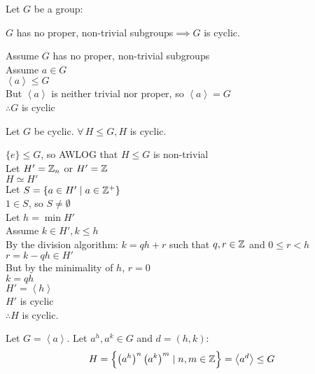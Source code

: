\documentclass[letterpaper,12pt,fleqn]{article}
\newcommand{\cycle}[1]{\left<#1\right>}
\begin{document}
\begin{theorem}
  Let $G$ be a group:

  $G$ has no proper, non-trivial subgroups$\implies G$ is cyclic.
\end{theorem}

\begin{theproof}
  Assume $G$ has no proper, non-trivial subgroups \\
  Assume $a\in G$ \\
  $\cycle{a}\le G$ \\
  But $\cycle{a}$ is neither trivial nor proper, so $\cycle{a}=G$ \\
  $\therefore G$ is cyclic
\end{theproof}

\begin{theorem}
  Let $G$ be cyclic. $\forall\,H\le G,H$ is cyclic.
\end{theorem}

\begin{theproof}
  $\{e\}\le G$, so AWLOG that $H\le G$ is non-trivial \\
  Let $H'=\mathbb{Z}_n$ or $H'=\mathbb{Z}$ \\
  $H\simeq H'$ \\
  Let $S=\{a\in H'\mid a\in\mathbb{Z}^+\}$ \\
  $1\in S$, so $S\ne\emptyset$ \\
  Let $h=\min H'$ \\
  Assume $k\in H',k\le h$ \\
  By the division algorithm: $k=qh+r$ such that $q,r\in\mathbb{Z}$ and $0\le r<h$ \\
  $r=k-qh\in H'$ \\
  But by the minimality of $h$, $r=0$ \\
  $k=qh$ \\
  $H'=\cycle{h}$ \\
  $H'$ is cyclic \\
  $\therefore H$ is cyclic.
\end{theproof}

\begin{theorem}
  Let $G=\cycle{a}$. Let $a^h,a^k\in G$ and $d=(h,k)$:
  \[H=\left\{\left(a^h\right)^n\left(a^k\right)^m\mid n,m\in\Z\right\}=
    \cycle{a^d}\le G\]
\end{theorem}
\end{document}
